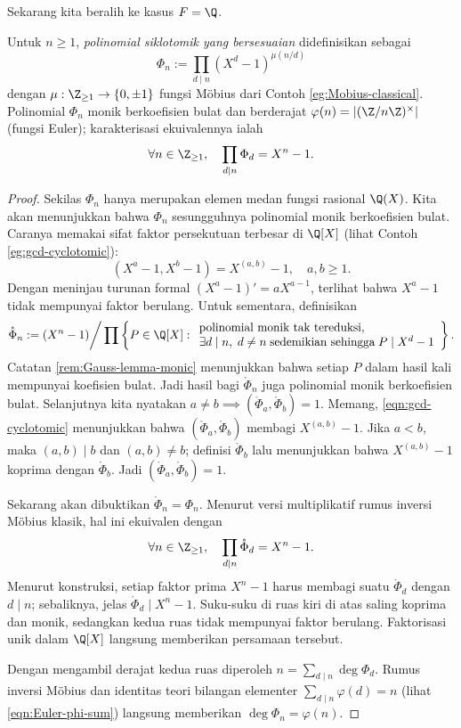 Sekarang kita beralih ke kasus $F=\Q$.
\begin{definition-theorem}
	Untuk $n \geq 1$, \emph{polinomial siklotomik yang bersesuaian} didefinisikan sebagai
	\[ \Phi_n := \prod_{d \mid n} (X^d-1)^{\mu(n/d)} \]
	dengan $\mu:\Z_{\geq1}\to\{0,\pm1\}$ fungsi Möbius dari Contoh \ref{eg:Mobius-classical}. Polinomial $\Phi_n$ monik berkoefisien bulat dan berderajat $\varphi(n)=|(\Z/n\Z)^\times|$ (fungsi Euler); karakterisasi ekuivalennya ialah
	\[ \forall n \in \Z_{\geq 1}, \quad \prod_{d \mid n} \Phi_d = X^n - 1. \]
\end{definition-theorem}
\begin{proof}
	Sekilas $\Phi_n$ hanya merupakan elemen medan fungsi rasional $\Q(X)$. Kita akan menunjukkan bahwa $\Phi_n$ sesungguhnya polinomial monik berkoefisien bulat. Caranya memakai sifat faktor persekutuan terbesar di $\Q[X]$ (lihat Contoh \ref{eg:gcd-cyclotomic}):
	\begin{equation}\label{eqn:gcd-cyclotomic}
		\left( X^a - 1, X^b - 1 \right) = X^{(a,b)} - 1, \quad a,b \geq 1.
	\end{equation}
	Dengan meninjau turunan formal $(X^a-1)'=aX^{a-1}$, terlihat bahwa $X^a-1$ tidak mempunyai faktor berulang. Untuk sementara, definisikan
	\[ \mathring{\Phi}_n := (X^n - 1) \bigg/ \prod \left\{ P \in \Q[X]: \begin{array}{l}
		\text{polinomial monik tak tereduksi}, \\
		\exists d \mid n, \;d \neq n \;\text{sedemikian sehingga}\; P \mid X^d - 1
	\end{array} \right\} . \]
	Catatan \ref{rem:Gauss-lemma-monic} menunjukkan bahwa setiap $P$ dalam hasil kali mempunyai koefisien bulat. Jadi hasil bagi $\mathring{\Phi}_n$ juga polinomial monik berkoefisien bulat. Selanjutnya kita nyatakan $a\neq b\implies(\mathring{\Phi}_a,\mathring{\Phi}_b)=1$. Memang, \eqref{eqn:gcd-cyclotomic} menunjukkan bahwa $(\mathring{\Phi}_a,\mathring{\Phi}_b)$ membagi $X^{(a,b)}-1$. Jika $a<b$, maka $(a,b)\mid b$ dan $(a,b)\neq b$; definisi $\mathring{\Phi}_b$ lalu menunjukkan bahwa $X^{(a,b)}-1$ koprima dengan $\mathring{\Phi}_b$. Jadi $(\mathring{\Phi}_a,\mathring{\Phi}_b)=1$.

	Sekarang akan dibuktikan $\mathring{\Phi}_n=\Phi_n$. Menurut versi multiplikatif rumus inversi Möbius klasik, hal ini ekuivalen dengan
	\[ \forall n \in \Z_{\geq 1}, \quad \prod_{d \mid n} \mathring{\Phi}_d = X^n - 1. \]
	Menurut konstruksi, setiap faktor prima $X^n-1$ harus membagi suatu $\mathring{\Phi}_d$ dengan $d\mid n$; sebaliknya, jelas $\mathring{\Phi}_d\mid X^n-1$. Suku-suku di ruas kiri di atas saling koprima dan monik, sedangkan kedua ruas tidak mempunyai faktor berulang. Faktorisasi unik dalam $\Q[X]$ langsung memberikan persamaan tersebut.

	Dengan mengambil derajat kedua ruas diperoleh $n=\sum_{d\mid n}\deg\Phi_d$. Rumus inversi Möbius dan identitas teori bilangan elementer $\sum_{d\mid n}\varphi(d)=n$ (lihat \eqref{eqn:Euler-phi-sum}) langsung memberikan $\deg\Phi_n=\varphi(n)$.
\end{proof}
